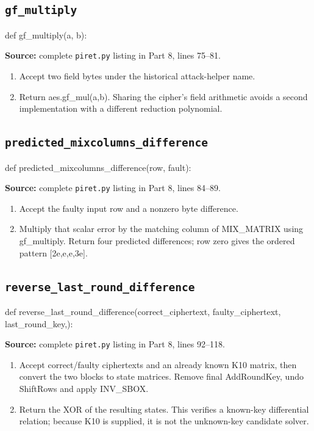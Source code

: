 \subsection{\texttt{gf\_\allowbreak{}multiply}}
\begin{lightcode}
def gf_multiply(a, b):
\end{lightcode}
\noindent\textbf{Source:} complete \texttt{piret.py} listing in Part 8, lines 75--81.
\begin{enumerate}
\item Accept two field bytes under the historical attack-helper name.
\item Return aes.gf\_mul(a,b). Sharing the cipher's field arithmetic avoids a second implementation with a different reduction polynomial.
\end{enumerate}
\subsection{\texttt{predicted\_\allowbreak{}mixcolumns\_\allowbreak{}difference}}
\begin{lightcode}
def predicted_mixcolumns_difference(row, fault):
\end{lightcode}
\noindent\textbf{Source:} complete \texttt{piret.py} listing in Part 8, lines 84--89.
\begin{enumerate}
\item Accept the faulty input row and a nonzero byte difference.
\item Multiply that scalar error by the matching column of MIX\_MATRIX using gf\_multiply. Return four predicted differences; row zero gives the ordered pattern [2e,e,e,3e].
\end{enumerate}
\subsection{\texttt{reverse\_\allowbreak{}last\_\allowbreak{}round\_\allowbreak{}difference}}
\begin{lightcode}
def reverse_last_round_difference(correct_ciphertext, faulty_ciphertext, last_round_key,):
\end{lightcode}
\noindent\textbf{Source:} complete \texttt{piret.py} listing in Part 8, lines 92--118.
\begin{enumerate}
\item Accept correct/faulty ciphertexts and an already known K10 matrix, then convert the two blocks to state matrices. Remove final AddRoundKey, undo ShiftRows and apply INV\_SBOX.
\item Return the XOR of the resulting states. This verifies a known-key differential relation; because K10 is supplied, it is not the unknown-key candidate solver.
\end{enumerate}
